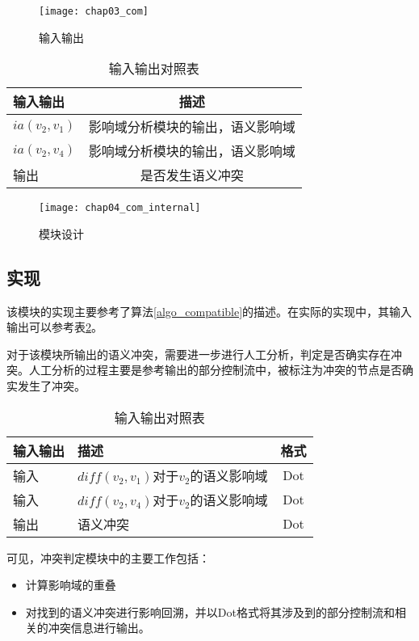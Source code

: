 \begin{figure}[H]
	\centering
	\texttt{[image: chap03\_com]}
	\caption {输入输出}
	\label {com}	
\end{figure}

\begin{table}[H]
	\caption{输入输出对照表}
	\label{com_io}
	\centering
	\begin{tabular}{lc}
		\toprule[1.5pt]
		{\heiti 输入输出} & {\heiti 描述} \\\midrule[1pt]
		$ia(v_2,v_1)$ & 影响域分析模块的输出，语义影响域 \\
		$ia(v_2,v_4)$ & 影响域分析模块的输出，语义影响域 \\
		输出 & 是否发生语义冲突\\
		\bottomrule[1.5pt]
	\end{tabular}
\end{table}

\begin{figure}[H]
	\centering
	\texttt{[image: chap04\_com\_internal]}
	\caption {模块设计}
	\label {des_com}	
\end{figure}

\subsection{实现}

该模块的实现主要参考了算法\ref {algo_compatible}的描述。在实际的实现中，其输入输出可以参考表\ref {com_io2}。

对于该模块所输出的语义冲突，需要进一步进行人工分析，判定是否确实存在冲突。人工分析的过程主要是参考输出的部分控制流中，被标注为冲突的节点是否确实发生了冲突。

\begin{table}[H]
	\caption{输入输出对照表}
	\label{com_io2}
	\centering
	\begin{tabular}{llc}
		\toprule[1.5pt]
		{\heiti 输入输出} & {\heiti 描述} & {\heiti 格式}\\\midrule[1pt]
		输入 & $diff(v_2,v_1)$对于$v_2$的语义影响域 & Dot\\
		输入 & $diff(v_2,v_4)$对于$v_2$的语义影响域 & Dot\\
		输出 & 语义冲突 & Dot \\
		\bottomrule[1.5pt]
	\end{tabular}
\end{table}

可见，冲突判定模块中的主要工作包括：
\begin{itemize}
	\item 计算影响域的重叠
	\item 对找到的语义冲突进行影响回溯，并以Dot格式将其涉及到的部分控制流和相关的冲突信息进行输出。
\end{itemize}


